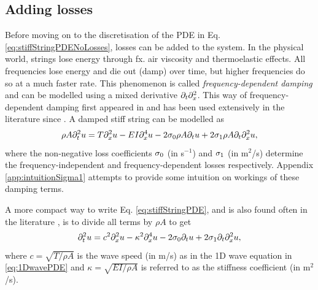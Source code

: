 

\subsection{Adding losses}
Before moving on to the discretisation of the PDE in Eq. \eqref{eq:stiffStringPDENoLosses}, losses can be added to the system. In the physical world, strings lose energy through fx. air viscosity and thermoelastic effects. All frequencies lose energy and die out (damp) over time, but higher frequencies do so at a much faster rate. This phenomenon is called \textit{frequency-dependent damping} and can be modelled using a mixed derivative $\partial_t \partial_x^2$. This way of frequency-dependent damping first appeared in \cite{Bensa2003} and has been used extensively in the literature since \cite{Valimaki2006,theBible}. A damped stiff string can be modelled as
\begin{equation}\label{eq:stiffStringPDE}
    \rho A \partial_t^2 u = T \partial_x^2 u - EI \partial_x^4 u - 2 \sigma_{0} \rho A \partial_t u + 2 \sigma_{1} \rho A\partial_t \partial_x^2 u,
\end{equation}
where the non-negative loss coefficients $\sigma_{0}$ (in s$^{-1}$) and $\sigma_{1}$ (in m$^2$/s) determine the frequency-independent and frequency-dependent losses respectively. Appendix \ref{app:intuitionSigma1} attempts to provide some intuition on workings of these damping terms.

A more compact way to write Eq. \eqref{eq:stiffStringPDE}, and is also found often in the literature \cite{theBible}, is to divide all terms by $\rho A$ to get
\begin{equation}\label{eq:stiffStringPDECompact}
    \partial_t^2 u = c^2 \partial_x^2 u - \kappa^2 \partial_x^4 u - 2 \sigma_{0} \partial_t u + 2 \sigma_{1} \partial_t \partial_x^2 u,
\end{equation}
where $c=\sqrt{T/\rho A}$ is the wave speed  (in m/s) as in the 1D wave equation in \eqref{eq:1DwavePDE} and $\kappa = \sqrt{EI / \rho A}$ is referred to as the stiffness coefficient (in m$^2$/s). 

